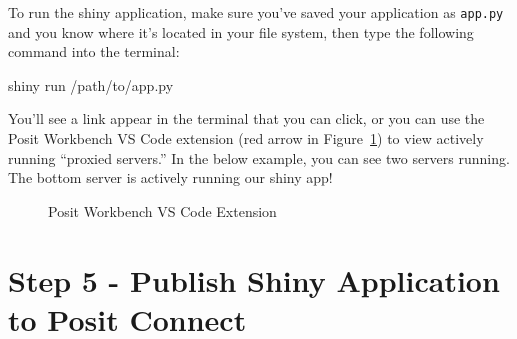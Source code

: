 \documentclass[
  letterpaper,
  DIV=11,
  numbers=noendperiod]{scrreprt}
\newenvironment{Shaded}{\begin{snugshade}}{\end{snugshade}}
\newcommand{\ExtensionTok}[1]{\textcolor[rgb]{0.00,0.23,0.31}{#1}}
\newcommand{\NormalTok}[1]{\textcolor[rgb]{0.00,0.23,0.31}{#1}}
\begin{document}
To run the shiny application, make sure you've saved your application as
\texttt{app.py} and you know where it's located in your file system,
then type the following command into the terminal:

\begin{Shaded}
\begin{Highlighting}[]
\ExtensionTok{shiny}\NormalTok{ run /path/to/app.py}
\end{Highlighting}
\end{Shaded}

You'll see a link appear in the terminal that you can click, or you can
use the Posit Workbench VS Code extension (red arrow in
Figure~\ref{fig-vscode-pwb-extension}) to view actively running
``proxied servers.'' In the below example, you can see two servers
running. The bottom server is actively running our shiny app!

\begin{figure}


\caption{\label{fig-vscode-pwb-extension}Posit Workbench VS Code
Extension}

\end{figure}%

\section{Step 5 - Publish Shiny Application to Posit
Connect}\label{step-5---publish-shiny-application-to-posit-connect}
\end{document}
